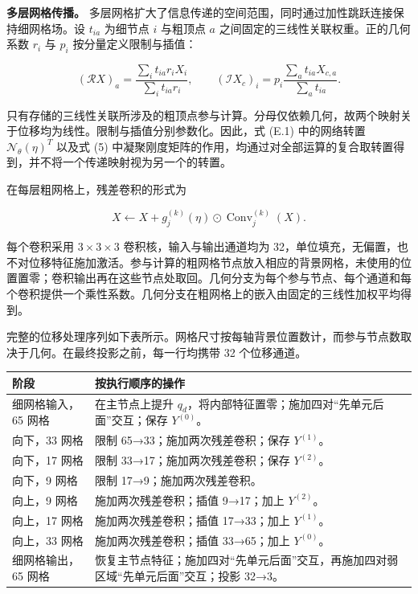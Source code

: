 \documentclass[preprint,12pt,authoryear]{elsarticle}
\def\LTcaptype{table}
\begin{document}
\textbf{多层网格传播。} 多层网格扩大了信息传递的空间范围，同时通过加性跳跃连接保持细网格场。设 \(t_{ia}\) 为细节点 \(i\) 与粗顶点 \(a\) 之间固定的三线性关联权重。正的几何系数 \(r_i\) 与 \(p_i\) 按分量定义限制与插值：

\[
(\mathcal R X)_a=\frac{\sum_i t_{ia}r_iX_i}{\sum_i t_{ia}r_i},
\qquad
(\mathcal I X_c)_i=p_i\frac{\sum_a t_{ia}X_{c,a}}{\sum_a t_{ia}}.
\]

只有存储的三线性关联所涉及的粗顶点参与计算。分母仅依赖几何，故两个映射关于位移均为线性。限制与插值分别参数化。因此，式 (E.1) 中的网络转置 \(\mathcal N_\theta(\eta)^T\) 以及式 (5) 中凝聚刚度矩阵的作用，均通过对全部运算的复合取转置得到，并不将一个传递映射视为另一个的转置。

在每层粗网格上，残差卷积的形式为

\[
X\leftarrow X+g^{(k)}_j(\eta)\odot\operatorname{Conv}^{(k)}_j(X).
\]

每个卷积采用 \(3\times3\times3\) 卷积核，输入与输出通道均为 32，单位填充，无偏置，也不对位移特征施加激活。参与计算的粗网格节点放入相应的背景网格，未使用的位置置零；卷积输出再在这些节点处取回。几何分支为每个参与节点、每个通道和每个卷积提供一个乘性系数。几何分支在粗网格上的嵌入由固定的三线性加权平均得到。

完整的位移处理序列如下表所示。网格尺寸按每轴背景位置数计，而参与节点数取决于几何。在最终投影之前，每一行均携带 32 个位移通道。

{\def\LTcaptype{} %
{\small
\begin{longtable}[]{@{}
  >{\raggedright\arraybackslash}p{}
  >{\raggedright\arraybackslash}p{}@{}}
\toprule\noalign{}
\begin{minipage}[b]{\linewidth}\raggedright
阶段
\end{minipage} & \begin{minipage}[b]{\linewidth}\raggedright
按执行顺序的操作
\end{minipage} \\
\midrule\noalign{}
\endhead
\bottomrule\noalign{}
\endlastfoot
细网格输入，65 网格 & 在主节点上提升 \(q_d\)，将内部特征置零；施加四对``先单元后面''交互；保存 \(Y^{(0)}\)。 \\
向下，33 网格 & 限制 65→33；施加两次残差卷积；保存 \(Y^{(1)}\)。 \\
向下，17 网格 & 限制 33→17；施加两次残差卷积；保存 \(Y^{(2)}\)。 \\
向下，9 网格 & 限制 17→9；施加两次残差卷积。 \\
向上，9 网格 & 施加两次残差卷积；插值 9→17；加上 \(Y^{(2)}\)。 \\
向上，17 网格 & 施加两次残差卷积；插值 17→33；加上 \(Y^{(1)}\)。 \\
向上，33 网格 & 施加两次残差卷积；插值 33→65；加上 \(Y^{(0)}\)。 \\
细网格输出，65 网格 & 恢复主节点特征；施加四对``先单元后面''交互，再施加四对弱区域``先单元后面''交互；投影 32→3。 \\
\end{longtable}}
}
\end{document}
